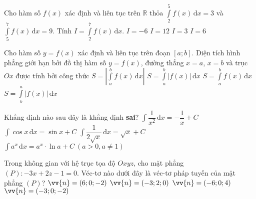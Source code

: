 \begin{ex}%
Cho hàm số $f(x)$ xác định và liên tục trên $\mathbb R$ thỏa $\displaystyle\int\limits_2^5f(x)\mathrm{\,d}x=3$ và $\displaystyle\int\limits_5^7f(x)\mathrm{\,d}x=9$. Tính $I=\displaystyle\int\limits_2^7f(x)\mathrm{\,d}x$.
\choice
{$I=-6$}
{\True $I=12$}
{$I=3$}
{$I=6$}
\end{ex}

\begin{ex}%
Cho hàm số $y=f(x)$ xác định và liên tục trên đoạn $[a;b]$. Diện tích hình phẳng giới hạn bởi đồ thị hàm số $y=f(x)$, đường thẳng $x=a$, $x=b$ và trục $Ox$ được tính bởi công thức
\choice
{$S=\left| \displaystyle\int\limits_a^bf(x)\mathrm{\,d}x\right|$}
{\True $S=\displaystyle\int\limits_a^b\left|f(x)\right|\mathrm{\,d}x$}
{$S=\displaystyle\int\limits_a^bf(x)\mathrm{\,d}x$}
{$S=\displaystyle\int\limits_b^a\left|f(x)\right|\mathrm{\,d}x$}
\end{ex}

\begin{ex}%
Khẳng định nào sau đây là khẳng định {\bf sai}?
\choice
{$\displaystyle\int\dfrac{1}{x^2}\mathrm{\,d}x=-\dfrac{1}{x}+C$}
{$\displaystyle\int\cos x\mathrm{\,d}x=\sin x+C$}
{$\displaystyle\int\dfrac{1}{2\sqrt{x}}\mathrm{\,d}x=\sqrt{x}+C$}
{\True $\displaystyle\int a^x\mathrm{\,d}x=a^x\cdot\ln a+C\ (a>0,a\ne1)$}
\end{ex}

\begin{ex}%
Trong không gian với hệ trục tọa độ $Oxyz$, cho mặt phẳng $(P)\colon -3x+2z-1=0$. Véc-tơ nào dưới đây là véc-tơ pháp tuyến của mặt phẳng $(P)$?
\choice
{$\vv{n}=(6;0;-2)$}
{$\vv{n}=(-3;2;0)$}
{\True $\vv{n}=(-6;0;4)$}
{$\vv{n}=(-3;0;-2)$}
\end{ex}


